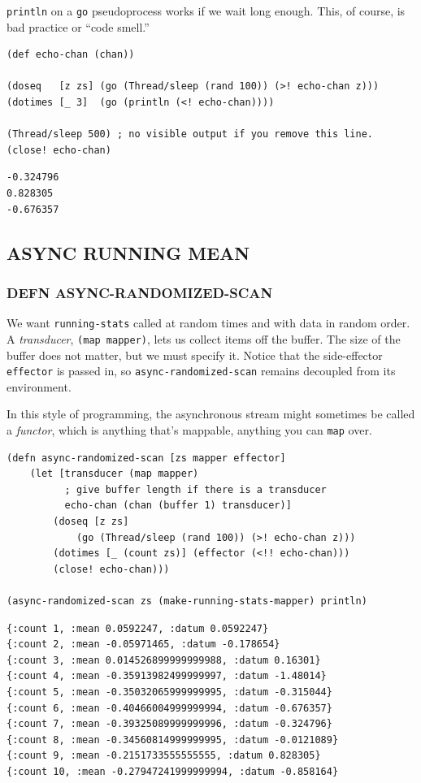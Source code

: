 \documentclass[10pt,oneside,x11names]{article}
\begin{document}
\texttt{println} on a \texttt{go} pseudoprocess works if we wait long enough. This, of
course, is bad practice or ``code smell.''

\begin{verbatim}
(def echo-chan (chan))

(doseq   [z zs] (go (Thread/sleep (rand 100)) (>! echo-chan z)))
(dotimes [_ 3]  (go (println (<! echo-chan))))

(Thread/sleep 500) ; no visible output if you remove this line.
(close! echo-chan)
\end{verbatim}

\begin{verbatim}
-0.324796
0.828305
-0.676357
\end{verbatim}

\subsection{ASYNC RUNNING MEAN}
\label{async-running-mean}
\subsubsection{DEFN ASYNC-RANDOMIZED-SCAN}
\label{async-randomized-scan}
We want \texttt{running-stats} called at random times and with data in random
order. A \emph{transducer}, \texttt{(map mapper)}, lets us collect items off the
buffer. The size of the buffer does not matter, but we must specify it.
Notice that the side-effector \texttt{effector} is passed in, so
\texttt{async-randomized-scan} remains decoupled from its environment.

In this style of programming, the asynchronous stream might sometimes be
called a \emph{functor}, which is anything that's mappable, anything you can
\texttt{map} over.

\begin{verbatim}
(defn async-randomized-scan [zs mapper effector]
    (let [transducer (map mapper)
          ; give buffer length if there is a transducer
          echo-chan (chan (buffer 1) transducer)]
        (doseq [z zs]
            (go (Thread/sleep (rand 100)) (>! echo-chan z)))
        (dotimes [_ (count zs)] (effector (<!! echo-chan)))
        (close! echo-chan)))

(async-randomized-scan zs (make-running-stats-mapper) println)
\end{verbatim}

\begin{verbatim}
{:count 1, :mean 0.0592247, :datum 0.0592247}
{:count 2, :mean -0.05971465, :datum -0.178654}
{:count 3, :mean 0.014526899999999988, :datum 0.16301}
{:count 4, :mean -0.35913982499999997, :datum -1.48014}
{:count 5, :mean -0.35032065999999995, :datum -0.315044}
{:count 6, :mean -0.40466004999999994, :datum -0.676357}
{:count 7, :mean -0.39325089999999996, :datum -0.324796}
{:count 8, :mean -0.34560814999999995, :datum -0.0121089}
{:count 9, :mean -0.2151733555555555, :datum 0.828305}
{:count 10, :mean -0.27947241999999994, :datum -0.858164}
\end{verbatim}
\end{document}
